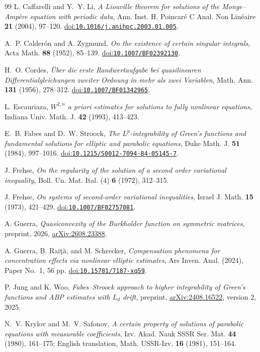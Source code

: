 \documentclass[11pt,a4paper,reqno]{amsart}
\theoremstyle{plain}
\theoremstyle{remark}
\numberwithin{equation}{section}
\newcommand{\doi}[1]{\href{https://doi.org/#1}{doi:\nolinkurl{#1}}}
\begin{document}
\begin{thebibliography}{99}
L. Caffarelli and Y.~Y. Li,
\emph{A Liouville theorem for solutions of the Monge--Amp\`ere equation with periodic data},
Ann. Inst. H. Poincar\'e C Anal. Non Lin\'eaire \textbf{21} (2004), 97--120.
\doi{10.1016/j.anihpc.2003.01.005}.

A.~P. Calder\'on and A. Zygmund,
\emph{On the existence of certain singular integrals},
Acta Math. \textbf{88} (1952), 85--139.
\doi{10.1007/BF02392130}.

H.~O. Cordes,
\emph{\"Uber die erste Randwertaufgabe bei quasilinearen Differentialgleichungen zweiter Ordnung in mehr als zwei Variablen},
Math. Ann. \textbf{131} (1956), 278--312.
\doi{10.1007/BF01342965}.

L. Escauriaza,
\emph{$W^{2,n}$ a priori estimates for solutions to fully nonlinear equations},
Indiana Univ. Math. J. \textbf{42} (1993), 413--423.

E.~B. Fabes and D.~W. Stroock,
\emph{The $L^p$-integrability of Green's functions and fundamental solutions for elliptic and parabolic equations},
Duke Math. J. \textbf{51} (1984), 997--1016.
\doi{10.1215/S0012-7094-84-05145-7}.

J. Frehse,
\emph{On the regularity of the solution of a second order variational inequality},
Boll. Un. Mat. Ital. (4) \textbf{6} (1972), 312--315.

J. Frehse,
\emph{On systems of second-order variational inequalities},
Israel J. Math. \textbf{15} (1973), 421--429.
\doi{10.1007/BF02757081}.

A. Guerra,
\emph{Quasiconvexity of the Burkholder function on symmetric matrices},
preprint, 2026, \href{https://arxiv.org/abs/2608.23388}{arXiv:2608.23388}.

A. Guerra, B. Rai\c{t}\u{a}, and M. Schrecker,
\emph{Compensation phenomena for concentration effects via nonlinear elliptic estimates},
Ars Inven. Anal. (2024), Paper No.~1, 56 pp.
\doi{10.15781/7187-xq59}.

P. Jung and K. Woo,
\emph{Fabes--Stroock approach to higher integrability of Green's functions and ABP estimates with $L_d$ drift},
preprint, \href{https://arxiv.org/abs/2408.16522}{arXiv:2408.16522}, version 2, 2025.

N.~V. Krylov and M.~V. Safonov,
\emph{A certain property of solutions of parabolic equations with measurable coefficients},
Izv. Akad. Nauk SSSR Ser. Mat. \textbf{44} (1980), 161--175;
English translation, Math. USSR-Izv. \textbf{16} (1981), 151--164.


\end{thebibliography}
\end{document}
